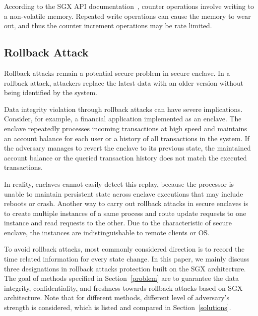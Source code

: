 According to the SGX API documentation~\cite{rozas2013intel}, counter operations involve writing to a non-volatile memory. Repeated write operations can cause the memory to wear out, and thus the counter increment operations may be rate limited. 


\subsection{Rollback Attack}

Rollback attacks remain a potential secure problem in secure enclave. In a rollback attack, attackers replace the latest data with an older version without being identified by the system. 

Data integrity violation through rollback attacks can have severe implications. Consider, for example, a financial application implemented as an enclave. The enclave repeatedly processes incoming transactions at high speed and maintains an account balance for each user or a history of all transactions in the system. If the adversary manages to revert the enclave to its previous state, the maintained account balance or the queried transaction history does not match the executed transactions.

In reality, enclaves cannot easily detect this replay, because the processor is unable to maintain persistent state across enclave executions that may include reboots or crash. Another way to carry out rollback attacks in secure enclaves is to create multiple instances of a same process and route update requests to one instance and read requests to the other. Due to the characteristic of secure enclave, the instances are indistinguishable to remote clients or OS.

To avoid rollback attacks, most commonly considered direction is to record the time related information for every state change. In this paper, we mainly discuss three designations in rollback attacks protection built on the SGX architecture. The goal of methods specified in Section~\ref{problem} are to guarantee the data integrity, confidentiality, and freshness towards rollback attacks based on SGX architecture. Note that for different methods, different level of adversary's strength is considered, which is listed and compared in Section~\ref{solutions}.

